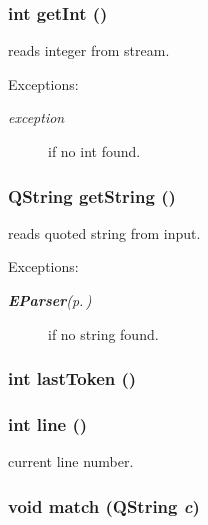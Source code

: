 \subsubsection{\setlength{\rightskip}{0pt plus 5cm}int get\-Int ()}\label{classParser_a10}


reads integer from stream. \begin{Desc}
\item[Exceptions:]
\begin{description}
\item[{\em exception}]if no int found. \end{description}
\end{Desc}


\subsubsection{\setlength{\rightskip}{0pt plus 5cm}QString get\-String ()}\label{classParser_a12}


reads quoted string from input. \begin{Desc}
\item[Exceptions:]
\begin{description}
\item[{\em {\bf EParser}{\rm (p.\,\pageref{classEParser})}}]if no string found. \end{description}
\end{Desc}


\subsubsection{\setlength{\rightskip}{0pt plus 5cm}int last\-Token ()}\label{classParser_a6}


\subsubsection{\setlength{\rightskip}{0pt plus 5cm}int line ()}\label{classParser_a3}


current line number. 

\subsubsection{\setlength{\rightskip}{0pt plus 5cm}void match (QString {\em c})}\label{classParser_a13}


